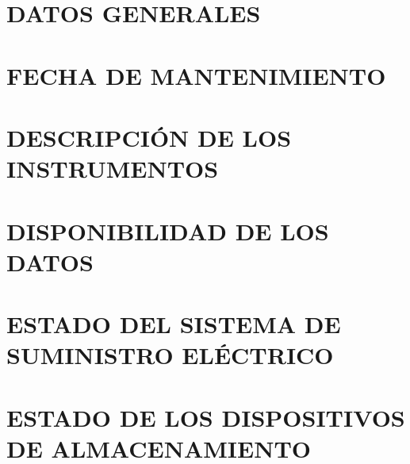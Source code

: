 \documentclass[a4paper, 12pt, final]{article}
\begin{document}


\tableofcontents
\newpage

\section{DATOS GENERALES}


\section{FECHA DE MANTENIMIENTO}


\section{DESCRIPCIÓN DE LOS INSTRUMENTOS}

\section{DISPONIBILIDAD DE LOS DATOS}

\section{ESTADO DEL SISTEMA DE SUMINISTRO ELÉCTRICO}


\section{ESTADO DE LOS DISPOSITIVOS DE ALMACENAMIENTO}

\end{document}
